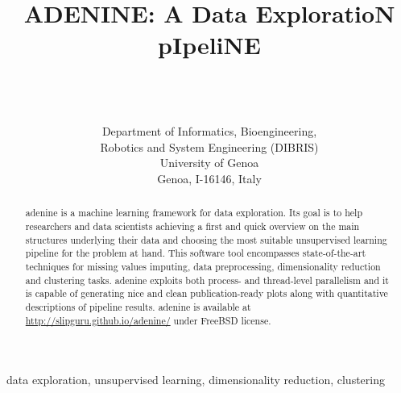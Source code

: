 \documentclass[twoside,11pt]{article}
\makeatletter
\newcommand{\ade}{{\sc adenine}\@\xspace}
\makeatother
\begin{document}
\title{{\sc ADENINE: A Data ExploratioN pIpeliNE}}

\author{ \\
 \\
 \\[1em]
\addr Department of Informatics, Bioengineering, \\Robotics and System Engineering (DIBRIS)\\
     University of Genoa\\
     Genoa, I-16146, Italy}



\maketitle

\begin{abstract}%
\ade is a machine learning framework for data exploration.
Its goal is to help researchers and data scientists achieving a first and quick overview on the main structures underlying their data and choosing the most suitable unsupervised learning pipeline for the problem at hand.
This software tool encompasses state-of-the-art techniques for missing values imputing, data preprocessing, dimensionality reduction and clustering tasks.
\ade exploits both process- and thread-level parallelism and it is capable of generating nice and clean publication-ready plots along with quantitative descriptions of pipeline results. \ade is available at \mbox{\small\url{http://slipguru.github.io/adenine/}} under FreeBSD license.

\end{abstract}

\begin{keywords}
data exploration, unsupervised learning, dimensionality reduction, clustering %
\end{keywords}
\end{document}
